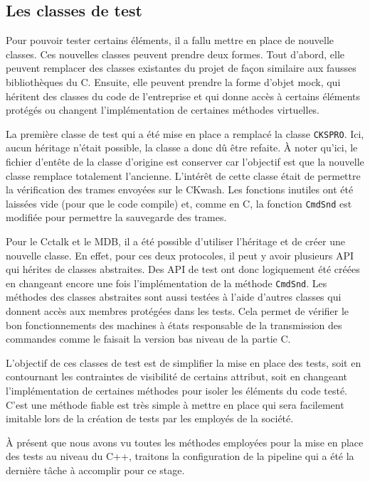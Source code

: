 \documentclass[a4paper]{article}
\begin{document}
\subsection{Les classes de test}%

Pour pouvoir tester certains éléments, il a fallu mettre en place de nouvelle
classes. Ces nouvelles classes peuvent prendre deux formes. Tout d'abord, elle
peuvent remplacer des classes existantes du projet de façon similaire aux
fausses bibliothèques du C. Ensuite, elle peuvent prendre la forme d'objet mock,
qui héritent des classes du code de l'entreprise et qui donne accès à certains
éléments protégés ou changent l'implémentation de certaines méthodes virtuelles.

La première classe de test qui a été mise en place a remplacé la classe
\verb|CKSPRO|. Ici, aucun héritage n'était possible, la classe a donc dû être
refaite. À noter qu'ici, le fichier d'entête de la classe d'origine est
conserver car l'objectif est que la nouvelle classe remplace totalement
l'ancienne. L'intérêt de cette classe était de permettre la vérification des
trames envoyées sur le CKwash. Les fonctions inutiles ont été laissées vide
(pour que le code compile) et, comme en C, la fonction \verb|CmdSnd| est
modifiée pour permettre la sauvegarde des trames.

Pour le Cctalk et le MDB, il a été possible d'utiliser l'héritage et de créer
une nouvelle classe. En effet, pour ces deux protocoles, il peut y avoir
plusieurs API qui hérites de classes abstraites. Des API de test ont donc
logiquement été créées en changeant encore une fois l'implémentation de la
méthode \verb|CmdSnd|. Les méthodes des classes abstraites sont aussi testées à
l'aide d'autres classes qui donnent accès aux membres protégées dans les tests.
Cela permet de vérifier le bon fonctionnements des machines à états
responsable de la transmission des commandes comme le faisait la version bas
niveau de la partie C.

L'objectif de ces classes de test est de simplifier la mise en place des tests,
soit en contournant les contraintes de visibilité de certains attribut, soit en
changeant l'implémentation de certaines méthodes pour isoler les éléments du
code testé. C'est une méthode fiable est très simple à mettre en place qui sera
facilement imitable lors de la création de tests par les employés de la société.

À présent que nous avons vu toutes les méthodes employées pour la mise en place
des tests au niveau du C++, traitons la configuration de la pipeline qui a été
la dernière tâche à accomplir pour ce stage.
\end{document}
